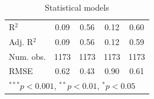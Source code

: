 \documentclass{beamer}
\newcommand{\1}{\mathbb{1}}
\begin{document}
\begin{frame}
\begin{table}
\begin{center}
\begin{tabular}{l c c c c }
\hline
R$^2$       & 0.09          & 0.56          & 0.12          & 0.60          \\
Adj. R$^2$  & 0.09          & 0.56          & 0.12          & 0.59          \\
Num. obs.   & 1173          & 1173          & 1173          & 1173          \\
RMSE        & 0.62          & 0.43          & 0.90          & 0.61          \\
\hline
\multicolumn{5}{l}{\scriptsize{$^{***}p<0.001$, $^{**}p<0.01$, $^*p<0.05$}}
\end{tabular}
\caption{Statistical models}
\label{table:coefficients}
\end{center}
\end{table}
\end{frame}
\end{document}
